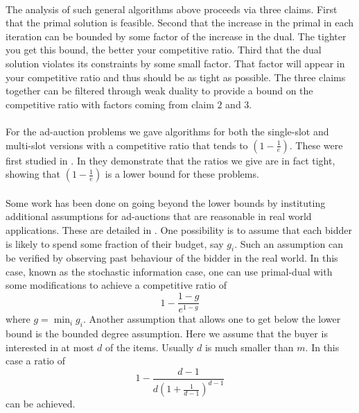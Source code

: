 \documentclass[letterpaper,12pt,oneside,onecolumn]{article}
\begin{document}
\paragraph{}
The analysis of such general algorithms above proceeds via three claims. First that the primal solution is feasible. Second that the increase in the primal in each iteration can be bounded by some factor of the increase in the dual. The tighter you get this bound, the better your competitive ratio. Third that the dual solution violates its constraints by some small factor. That factor will appear in your competitive ratio and thus should be as tight as possible. The three claims together can be filtered through weak duality to provide a bound on the competitive ratio with factors coming from claim $2$ and $3$.
\paragraph{}
For the ad-auction problems we gave algorithms for both the single-slot and multi-slot versions with a competitive ratio that tends to $(1-\frac{1}{e})$. These were first studied in \cite{buchbinder2007online}. In \cite{mehta2007adwords} they demonstrate that the ratios we give are in fact tight, showing that $(1-\frac{1}{e})$ is a lower bound for these problems. 
\paragraph{}
Some work has been done on going beyond the lower bounds by instituting additional assumptions for ad-auctions that are reasonable in real world applications. These are detailed in \cite{buchbinder2009design}. One possibility is to assume that each bidder is likely to spend some fraction of their budget, say $g_i$. Such an assumption can be verified by observing past behaviour of the bidder in the real world. In this case, known as the stochastic information case, one can use primal-dual with some modifications to achieve a competitive ratio of $$1-\frac{1-g}{e^{1-g}}$$
where $g = \min_{i} g_i$. Another assumption that allows one to get below the lower bound is the bounded degree assumption. Here we assume that the buyer is interested in at most $d$ of the items. Usually $d$ is much smaller than $m$. In this case a ratio of 
$$1-\frac{d-1}{d(1+\frac{1}{d-1})^{d-1}}$$
can be achieved.


\end{document}
